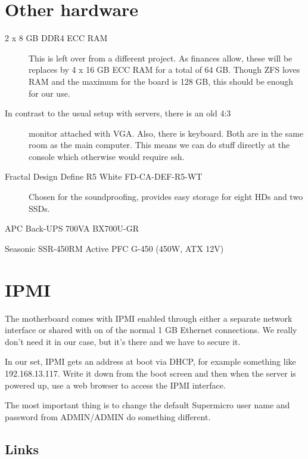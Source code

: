 \documentclass[a4paper,10pt,english]{sphinxmanual}
\begin{document}
\section{Other hardware}
\label{\detokenize{hardware:other-hardware}}\begin{description}
\item[{ 2 x 8 GB DDR4 ECC RAM}] \leavevmode
This is left over from a different project. As finances allow, these
will be replaces by 4 x 16 GB ECC RAM for a total of 64 GB. Though ZFS
loves RAM and the maximum for the board is 128 GB, this should be enough
for our use.

\item[{ In contrast to the usual setup with servers, there is an old 4:3}] \leavevmode
monitor attached with VGA. Also, there is keyboard. Both are in the same
room as the main computer. This means we can do stuff directly at the
console which otherwise would require ssh.

\item[{ Fractal Design Define R5 White FD-CA-DEF-R5-WT}] \leavevmode
Chosen for the soundproofing, provides easy storage for eight HDs and
two SSDs.

\end{description}

 APC Back-UPS 700VA BX700U-GR

 Seasonic SSR-450RM Active PFC G-450 (450W, ATX 12V)


\section{IPMI}
\label{\detokenize{hardware:ipmi}}
The motherboard comes with IPMI enabled through either a separate network
interface or shared with on of the normal 1 GB Ethernet connections. We really
don’t need it in our case, but it’s there and we have to secure it.

In our set, IPMI gets an address at boot via DHCP, for example something like
192.168.13.117. Write it down from the boot screen and then when the server is
powered up, use a web browser to access the IPMI interface.

The most important thing is to change the default Supermicro user name and
password from ADMIN/ADMIN do something different.


\subsection{Links}
\label{\detokenize{hardware:links}}
\end{document}

